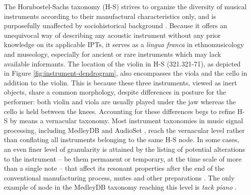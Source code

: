 The Hornbostel-Sachs taxonomy (H-S) strives to organize the diversity of musical instruments according to their manufactural characteristics only, and is purposefully unaffected by sociohistorical background \cite{montagu2009muzyka}.
Because it offers an unequivocal way of describing any acoustic instrument without any prior knowledge on its applicable IPTs, it serves as a \emph{lingua franca} in ethnomusicology and museology, especially for ancient or rare instruments which may lack available informants.
The location of the violin in H-S (321.321-71), as depicted in Figure \ref{fig:instrument-dendrogram}, also encompasses the viola and the cello in addition to the violin.
This is because these three instruments, viewed as inert objects, share a common morphology, despite differences in posture for the performer: both violin and viola are usually played under the jaw whereas the cello is held between the knees.
Accounting for these differences begs to refine H-S by means a vernacular taxonomy.
Most instrument taxonomies in music signal processing, including MedleyDB and AudioSet \cite{gemmeke2017icassp}, reach the vernacular level rather than conflating all instruments belonging to the same H-S node.
In some cases, an even finer level of granularity is attained by the listing of potential alterations to the instrument -- be them permanent or temporary, at the time scale of more than a single note -- that affect its resonant properties after the end of the conventional manufacturing process, \eg{} mutes and other preparations \cite{dianova2007phd}.
The only example of node in the MedleyDB taxonomy reaching this level is \emph{tack piano} \cite{bittner2014ismir} .

